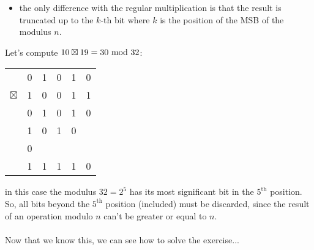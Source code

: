 \begin{itemize}
    \item the only difference with the regular multiplication is that the result is truncated up to the $k$-th bit where $k$ is the position of the MSB of the modulus $n$.
\end{itemize}
Let's compute $10\boxtimes19=30\text{ mod }32$:
\begin{center}
    \begin{tabular}{cccccc}
        &0&1&0&1&0\\
        $\boxtimes$&1&0&0&1&1\\
        \hline
        &0&1&0&1&0\\
        &1&0&1&0&\\
        &0&&&&\\
        \hline
        &1&1&1&1&0
    \end{tabular}
\end{center}
in this case the modulus $32=2^5$ has its most significant bit in the $5^{\text{th}}$ position. So, all bits beyond the $5^{\text{th}}$ position (included) must be discarded, since the result of an operation modulo $n$ can't be greater or equal to $n$.\\\\
Now that we know this, we can see how to solve the exercise...

\newpage

